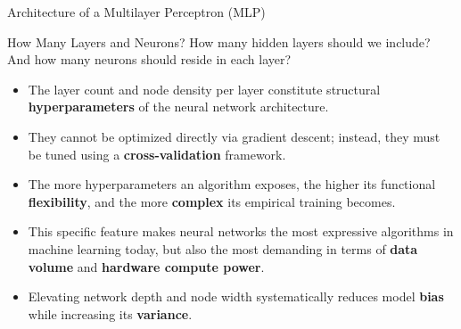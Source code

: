 \begin{frame}{Architecture of a Multilayer Perceptron (MLP)}
\begin{center}
{
		}
	\end{center}	
\end{frame}

\begin{frame}{How Many Layers and Neurons?}
	How many hidden layers should we include? And how many neurons should reside in each layer?
	\begin{itemize}
		\item The layer count and node density per layer constitute structural \textbf{hyperparameters} of the neural network architecture.
		\pause
		\item They cannot be optimized directly via gradient descent; instead, they must be tuned using a \textbf{cross-validation} framework.
		\pause
		\item The more hyperparameters an algorithm exposes, the higher its functional \textbf{flexibility}, and the more \textbf{complex} its empirical training becomes.
		\pause
		\item This specific feature makes neural networks the most expressive algorithms in machine learning today, but also the most demanding in terms of \textbf{data volume} and \textbf{hardware compute power}.
		\pause
		\item Elevating network depth and node width systematically reduces model \textbf{bias} while increasing its \textbf{variance}.
	\end{itemize}
\end{frame}

